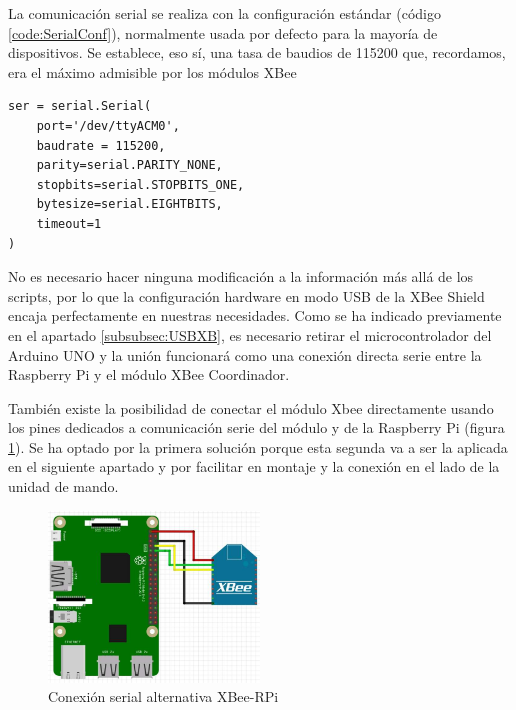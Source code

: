 La comunicación serial se realiza con la configuración estándar (código \ref{code:SerialConf}), normalmente usada por defecto para la mayoría de dispositivos. Se establece, eso sí, una tasa de baudios de 115200 que, recordamos, era el máximo admisible por los módulos XBee


\begin{lstlisting}[frame=leftline, caption={Configuración serial}, label=code:SerialConf]
ser = serial.Serial(
	port='/dev/ttyACM0',
	baudrate = 115200,
	parity=serial.PARITY_NONE,
	stopbits=serial.STOPBITS_ONE,
	bytesize=serial.EIGHTBITS,
	timeout=1
)
\end{lstlisting}

No es necesario hacer ninguna modificación a la información más allá de los scripts, por lo que la configuración hardware en modo USB de la XBee Shield encaja perfectamente en nuestras necesidades. Como se ha indicado previamente en el apartado \ref{subsubsec:USBXB}, es necesario retirar el microcontrolador del Arduino UNO y la unión funcionará como una conexión directa serie entre la Raspberry Pi y el módulo XBee Coordinador.

También existe la posibilidad de conectar el módulo Xbee directamente usando los pines dedicados a comunicación serie del módulo y de la Raspberry Pi (figura \ref{fig:RPiXBserial}). Se ha optado por la primera solución porque esta segunda va a ser la aplicada en el siguiente apartado y por facilitar en montaje y la conexión en el lado de la unidad de mando. 

\begin{figure}[hbt]
\centering
\includegraphics[width=0.5\textwidth]{figuras/RPiXBserial.png}
\caption{Conexión serial alternativa XBee-RPi}
\label{fig:RPiXBserial}
\end{figure}


